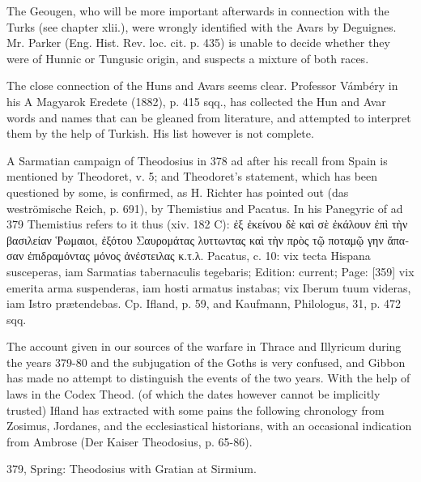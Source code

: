 The Geougen, who will be more important afterwards in connection with the Turks (see chapter xlii.), were wrongly identified with the Avars by Deguignes. Mr. Parker (Eng. Hist. Rev. loc. cit. p. 435) is unable to decide whether they were of Hunnic or Tungusic origin, and suspects a mixture of both races.

The close connection of the Huns and Avars seems clear. Professor Vámbéry in his A Magyarok Eredete (1882), p. 415 sqq., has collected the Hun and Avar words and names that can be gleaned from literature, and attempted to interpret them by the help of Turkish. His list however is not complete.


A Sarmatian campaign of Theodosius in 378 ad after his recall from Spain is mentioned by Theodoret, v. 5; and Theodoret\texthebrew{}’s statement, which has been questioned by some, is confirmed, as H. Richter has pointed out (das weströmische Reich, p. 691), by Themistius and Pacatus. In his Panegyric of ad 379 Themistius refers to it thus (xiv. 182 C): \textgreek{\texthebrew{ἐ}ξ \texthebrew{ἐ}κείνου δ\texthebrew{ὲ} κα\texthebrew{ὶ} σ\texthebrew{ὲ ἐ}κάλουν \texthebrew{ἐ}π\texthebrew{ὶ} τ\texthebrew{ὴ}ν βασιλείαν \texthebrew{Ῥ}ωμαιοι, \texthebrew{ἐ}ξότου Σαυρομάτας λυττωντας κα\texthebrew{ὶ} τ\texthebrew{ὴ}ν πρ\texthebrew{ὸ}ς τ\texthebrew{ῷ} ποταμ\texthebrew{ῷ} γην \texthebrew{ἄ}πασαν \texthebrew{ἐ}πιδραμόντας μόνος \texthebrew{ἀ}νέστειλας κ.τ.λ}. Pacatus, c. 10: vix tecta Hispana susceperas, iam Sarmatias tabernaculis tegebaris; Edition: current; Page: [359] vix emerita arma suspenderas, iam hosti armatus instabas; vix Iberum tuum videras, iam Istro prætendebas. Cp. Ifland, p. 59, and Kaufmann, Philologus, 31, p. 472 sqq.


The account given in our sources of the warfare in Thrace and Illyricum during the years 379-80 and the subjugation of the Goths is very confused, and Gibbon has made no attempt to distinguish the events of the two years. With the help of laws in the Codex Theod. (of which the dates however cannot be implicitly trusted) Ifland has extracted with some pains the following chronology from Zosimus, Jordanes, and the ecclesiastical historians, with an occasional indication from Ambrose (Der Kaiser Theodosius, p. 65-86).

379, Spring:
Theodosius with Gratian at Sirmium.

